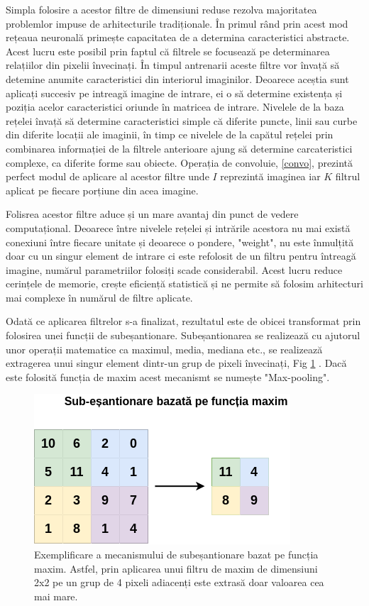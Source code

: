 \documentclass[a4paper,12pt]{book}
\begin{document}
				Simpla folosire a acestor filtre de dimensiuni reduse rezolva majoritatea problemlor impuse de arhitecturile tradiționale. În primul rând prin acest mod rețeaua neuronală primește capacitatea de a determina caracteristici abstracte. Acest lucru este posibil prin faptul că filtrele se focusează pe determinarea relațiilor din pixelii învecinați. În timpul antrenarii aceste filtre vor învață să detemine anumite caracteristici din interiorul imaginilor. Deoarece aceștia sunt aplicați succesiv pe intreagă imagine de intrare, ei o să determine existența și poziția acelor caracteristici oriunde în matricea de intrare. Nivelele de la baza rețelei învață să determine caracteristici simple că diferite puncte, linii sau curbe din diferite locații ale imaginii, în timp ce nivelele de la capătul rețelei prin combinarea informației de la filtrele anterioare ajung să determine carcateristici complexe, ca diferite forme sau obiecte. Operația de convoluie, \ref{convo}, prezintă perfect modul de aplicare al acestor filtre unde $I$ reprezintă imaginea iar $K$ filtrul aplicat pe fiecare porțiune din acea imagine.\par
				
				Folisrea acestor filtre aduce și un mare avantaj din punct de vedere computațional. Deoarece între nivelele rețelei și intrările acestora nu mai există conexiuni între fiecare unitate și deoarece o pondere, "weight", nu este înmulțită doar cu un singur element de intrare ci este refolosit de un filtru pentru întreagă imagine, numărul parametriilor folosiți scade considerabil. Acest lucru reduce cerințele de memorie, crește eficiență statistică și ne permite să folosim arhitecturi mai complexe în numărul de filtre aplicate. \par
				
				Odată ce aplicarea filtrelor s-a finalizat, rezultatul este de obicei transformat prin folosirea unei funcții de subeșantionare. Subeșantionarea se realizează cu ajutorul unor operații matematice ca maximul, media, mediana etc., se realizează extragerea unui singur element dintr-un grup de pixeli învecinați, Fig \ref{fig:maxpool} . Dacă este folosită funcția de maxim acest mecanismt se numește "Max-pooling".
				
				\begin{figure}[h]
					\centering
					\includegraphics[scale=0.60]{maxpool}
					\caption{Exemplificare a mecanismului de subeșantionare bazat pe funcția maxim. Astfel, prin aplicarea unui filtru de maxim de dimensiuni 2x2 pe un grup de 4 pixeli adiacenți este extrasă doar valoarea cea mai mare.} 
					\label{fig:maxpool}
				\end{figure}
				
\end{document}
